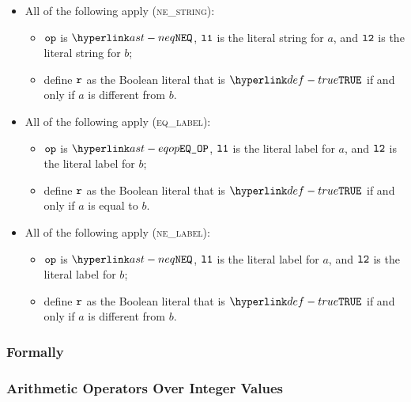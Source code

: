 \begin{itemize}
  \item All of the following apply (\textsc{ne\_string}):
  \begin{itemize}
    \item $\op$ is $\NEQ$, $\vlone$ is the literal string for $a$, and $\vltwo$ is the literal string for $b$;
    \item define $\vr$ as the Boolean literal that is $\True$ if and only if $a$ is different from $b$.
  \end{itemize}

  \item All of the following apply (\textsc{eq\_label}):
  \begin{itemize}
    \item $\op$ is $\EQOP$, $\vlone$ is the literal label for $a$, and $\vltwo$ is the literal label for $b$;
    \item define $\vr$ as the Boolean literal that is $\True$ if and only if $a$ is equal to $b$.
  \end{itemize}

  \item All of the following apply (\textsc{ne\_label}):
  \begin{itemize}
    \item $\op$ is $\NEQ$, $\vlone$ is the literal label for $a$, and $\vltwo$ is the literal label for $b$;
    \item define $\vr$ as the Boolean literal that is $\True$ if and only if $a$ is different from $b$.
  \end{itemize}

\end{itemize}

\subsubsection{Formally}

\begin{mathpar}
\end{mathpar}

\subsubsection{Arithmetic Operators Over Integer Values \label{sec:AthimeticOverInt}}
\begin{mathpar}
\end{mathpar}

